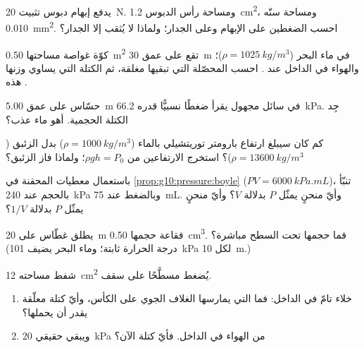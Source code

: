 \begin{exercise}[$\star\star$]\label{exo:g10:pressure:6}
يدفع إبهام دبوس تثبيت  \qty{20}{N}. ومساحة رأس الدبوس
\qty{1.2}{cm^2}، ومساحة سنّه \qty{0.010}{mm^2}. احسب الضغطين على
الإبهام وعلى الجدار؛ ولماذا لا يُثقب إلا الجدار؟
\end{exercise}

\begin{exercise}[$\star\star$]\label{exo:g10:pressure:7}
كوّة غواصة مساحتها \qty{0.50}{m^2} تقع على عمق \qty{30}{m} في
ماء البحر ($\rho = \qty{1025}{kg/m^3}$)؛ والهواء في الداخل عند
. احسب  المحصّلة التي تبقيها مغلقة، ثم
الكتلة التي يساوي وزنها هذه .
\end{exercise}

\begin{exercise}[$\star\star$]\label{exo:g10:pressure:8}
حسّاس على عمق \qty{5.00}{m} في سائل مجهول يقرأ ضغطًا
نسبيًّا قدره \qty{66.2}{kPa}. جِد الكتلة الحجمية. أهو ماء عذب؟
\end{exercise}

\begin{exercise}[$\star\star$]\label{exo:g10:pressure:9}
كم كان سيبلغ ارتفاع بارومتر توريتشيلي بالماء
($\rho = \qty{1000}{kg/m^3}$) بدل الزئبق
($\rho = \qty{13600}{kg/m^3}$)؟ استخرج الارتفاعين من
$\rho g h = P_0$؛ ولماذا فاز الزئبق؟
\end{exercise}

\begin{exercise}[$\star\star$]\label{exo:g10:pressure:10}
باستعمال معطيات المحقنة في \cref{prop:g10:pressure:boyle}
($PV = \qty{6000}{kPa.mL}$)، تنبّأ بالحجم عند \qty{240}{kPa} وبالضغط
عند \qty{75}{mL}. وأيّ منحنٍ يمثّل $P$ بدلالة $V$؟ وأيّ منحنٍ يمثّل $P$
بدلالة $1/V$؟
\end{exercise}

\begin{exercise}[$\star\star$]\label{exo:g10:pressure:11}
يطلق غطّاس على \qty{20}{m} فقاعة حجمها \qty{0.50}{cm^3}.
فما حجمها تحت السطح مباشرة؟ (درجة الحرارة ثابتة؛ وماء
البحر يضيف \qty{101}{kPa} لكل \qty{10}{m}.)
\end{exercise}

\begin{exercise}[$\star\star\star$]\label{exo:g10:pressure:12}
 شفط مساحته \qty{12}{cm^2} يُضغط مسطَّحًا على سقف.
\begin{enumerate}
  \item خلاء تامّ في الداخل: فما  التي يمارسها الغلاف الجوي على
        الكأس، وأيّ كتلة معلّقة يقدر أن يحملها؟
  \item ويبقي  حقيقي \qty{20}{kPa} من الهواء في الداخل. فأيّ كتلة الآن؟
\end{enumerate}
\end{exercise}


